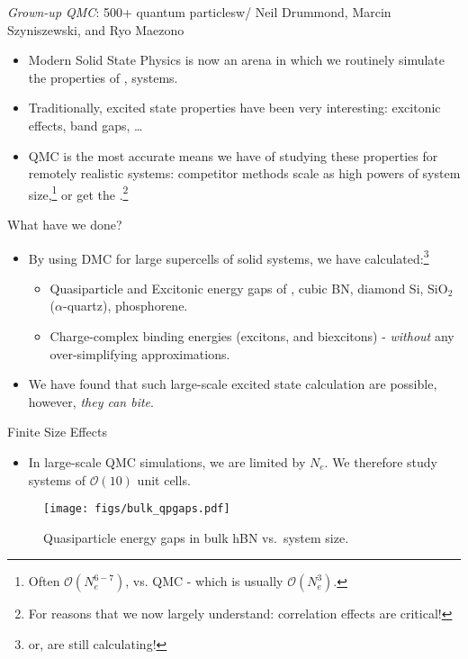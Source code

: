 \documentclass[12pt, pdf, hyperref={draft}, usenames, dvipsnames]{beamer}
\newcommand{\red}[1]{{\bf\color{LancsRed}{#1}}}
\newcommand{\green}[1]{{\bf\color{ForestGreen}{#1}}}
\begin{document}
\begin{frame}{{\itshape\/ Grown-up QMC}: 500+ quantum particles}{w/ Neil
Drummond, Marcin Szyniszewski, and Ryo Maezono}
\begin{itemize}
  \item Modern Solid State Physics is now an arena in which we routinely
  simulate the properties of \red{large}, \green{realistic} systems.

  \item Traditionally, excited state properties have been very interesting:
  excitonic effects, band gaps, \ldots

  \item QMC is the most accurate means we have of studying these properties
  for remotely realistic systems: competitor methods scale as high powers of
    system size,\footnote{Often $\mathcal{O}(N_e^{6-7})$, vs. QMC - which is
    usually $\mathcal{O}(N_e^3)$.} or get the \red{wrong answer}.\footnote{For
    reasons that we now largely understand: correlation effects are critical!}
\end{itemize}
\end{frame}

\begin{frame}{What have we done?}

  \begin{itemize}
    \item By using DMC for large supercells of solid systems, we have
    calculated:\footnote{or, are still calculating!}
    \begin{itemize}
      \item Quasiparticle and Excitonic energy gaps of \green{hexagonal BN},
      cubic BN, diamond Si, SiO$_2$ ($\alpha$-quartz), phosphorene.

      \item Charge-complex binding energies (excitons, and biexcitons) -
      \textit{without} any over-simplifying approximations.
    \end{itemize}
    \item We have found that such large-scale excited state calculation are
    possible, however, \textit{they can bite}.
  \end{itemize}
\end{frame}

\begin{frame}{Finite Size Effects}
  \begin{itemize}
    \item In large-scale QMC simulations, we are limited by $N_e$. We therefore
    study systems of $\mathcal{O}(10)$ unit cells.
  \end{itemize}

\begin{figure}[H]
  \centering
  \texttt{[image: figs/bulk\_qpgaps.pdf]}
  \caption{Quasiparticle energy gaps in bulk hBN vs.\ system size.}
\label{fig:bhbn_gaps}
\end{figure}

\end{frame}
\end{document}
